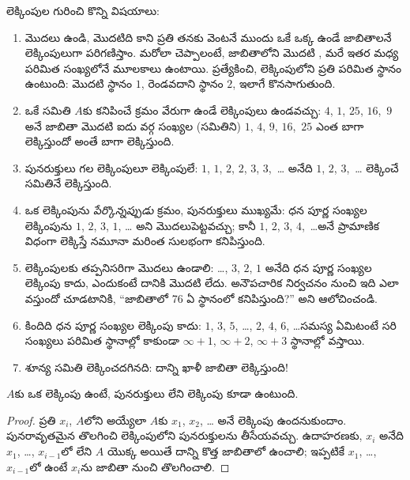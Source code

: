 \documentclass[../../../include/open-logic-section]{subfiles}
\begin{document}
\begin{explain}
లెక్కింపుల గురించి కొన్ని విషయాలు:
\begin{enumerate}
\item మొదలు ఉండి, మొదటిది కాని ప్రతి  తనకు వెంటనే ముందు
  ఒకే ఒక్క  ఉండే జాబితాలనే లెక్కింపులుగా పరిగణిస్తాం.
  మరోలా చెప్పాలంటే, జాబితాలోని మొదటి , మరే ఇతర
   మధ్య పరిమిత సంఖ్యలోనే మూలకాలు ఉంటాయి. ప్రత్యేకించి,
  లెక్కింపులోని ప్రతి  పరిమిత స్థానం ఉంటుంది: మొదటి
   స్థానం $1$, రెండవదాని స్థానం $2$, ఇలాగే కొనసాగుతుంది.
\item ఒకే సమితి $A$కు  కనిపించే క్రమం వేరుగా ఉండే
  లెక్కింపులు ఉండవచ్చు: $4$, $1$, $25$, $16$,~$9$ అనే జాబితా మొదటి
  ఐదు వర్గ సంఖ్యల (సమితిని) $1$, $4$, $9$, $16$,~$25$ ఎంత బాగా
  లెక్కిస్తుందో అంతే బాగా లెక్కిస్తుంది.
\item పునరుక్తులు గల లెక్కింపులూ లెక్కింపులే: $1$, $1$, $2$, $2$,
  $3$, $3$,~\dots{} అనేది $1$, $2$, $3$,~\dots{} లెక్కించే సమితినే
  లెక్కిస్తుంది.
\item ఒక లెక్కింపును \emph{పేర్కొన్నప్పుడు} క్రమం, పునరుక్తులు
  ముఖ్యమే: ధన పూర్ణ సంఖ్యల లెక్కింపును $1$, $2$, $3$, $1$, \dots{}
  అని మొదలుపెట్టవచ్చు; కానీ $1$, $2$, $3$, $4$,~\dots అనే ప్రామాణిక
  విధంగా లెక్కిస్తే నమూనా మరింత సులభంగా కనిపిస్తుంది.
\item లెక్కింపులకు తప్పనిసరిగా మొదలు ఉండాలి: \dots, $3$, $2$, $1$
  అనేది ధన పూర్ణ సంఖ్యల లెక్కింపు కాదు, ఎందుకంటే దానికి మొదటి
   లేదు. అనౌపచారిక నిర్వచనం నుంచి ఇది ఎలా వస్తుందో
  చూడటానికి, ``జాబితాలో 76 ఏ స్థానంలో కనిపిస్తుంది?'' అని ఆలోచించండి.
\item కిందిది ధన పూర్ణ సంఖ్యల లెక్కింపు కాదు:
  $1$, $3$, $5$, \dots, $2$, $4$, $6$, \dots\@ సమస్య ఏమిటంటే సరి
  సంఖ్యలు పరిమిత స్థానాల్లో కాకుండా $\infty + 1$, $\infty + 2$,
  $\infty + 3$ స్థానాల్లో వస్తాయి.
\item శూన్య సమితి లెక్కించదగినది: దాన్ని ఖాళీ జాబితా లెక్కిస్తుంది!{}
\end{enumerate}
\end{explain}

\begin{prop}
  $A$కు ఒక లెక్కింపు ఉంటే, పునరుక్తులు లేని లెక్కింపు కూడా ఉంటుంది.
\end{prop}

\begin{proof}
  ప్రతి $x_i$, $A$లోని  అయ్యేలా $A$కు $x_1$, $x_2$,
  \dots{} అనే లెక్కింపు ఉందనుకుందాం. పునరావృతమైన 
  తొలగించి లెక్కింపులోని పునరుక్తులను తీసేయవచ్చు. ఉదాహరణకు, $x_i$
  అనేది $x_1$, \dots, $x_{i-1}$లో లేని $A$ యొక్క  అయితే
  దాన్ని కొత్త జాబితాలో ఉంచాలి; ఇప్పటికే $x_1$, \dots,~$x_{i-1}$లో
  ఉంటే $x_i$ను జాబితా నుంచి తొలగించాలి.
\end{proof}
\end{document}

